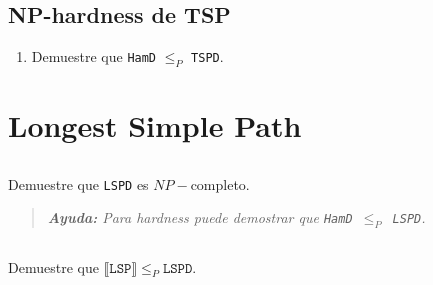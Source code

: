 \subsection{NP-hardness de TSP}
\begin{enumerate}
	\item[] Demuestre que \texttt{HamD} $\leq_P$ \texttt{TSPD}.
\end{enumerate}


\section{Longest Simple Path}
\subsection{} Demuestre que \texttt{LSPD} es $NP-$completo.
\begin{quote}
	\emph{\textbf{Ayuda:} Para hardness puede demostrar que \mbox{\texttt{HamD}
	$\leq_P$ \texttt{LSPD}}.}
\end{quote}

\subsection{} Demuestre que
	\(
		\llbracket
		\texttt{LSP}
		\rrbracket
		\leq_P
		\texttt{LSPD}
	\).


